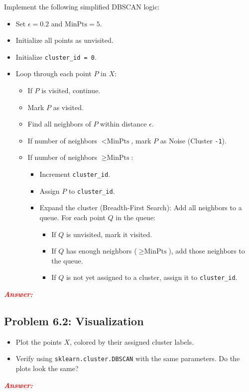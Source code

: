 \documentclass[11pt, letterpaper]{article}
\newcommand{\subproblem}[1]{\subsection*{Problem #1}}
\newcommand{\answer}{\textbf{\textit{\textcolor{red}{Answer:}}}}
\begin{document}
Implement the following simplified DBSCAN logic:
\begin{itemize}
    \item Set $\epsilon = 0.2$ and $\text{MinPts} = 5$.
    \item Initialize all points as unvisited.
    \item Initialize \texttt{cluster\_id = 0}.
    \item Loop through each point $P$ in $X$:
    \begin{itemize}
        \item If $P$ is visited, continue.
        \item Mark $P$ as visited.
        \item Find all neighbors of $P$ within distance $\epsilon$.
        \item If number of neighbors $< \text{MinPts}$, mark $P$ as Noise (Cluster \texttt{-1}).
        \item If number of neighbors $\ge \text{MinPts}$:
        \begin{itemize}
            \item Increment \texttt{cluster\_id}.
            \item Assign $P$ to \texttt{cluster\_id}.
            \item Expand the cluster (Breadth-First Search): Add all neighbors to a queue. For each point $Q$ in the queue:
            \begin{itemize}
                \item If $Q$ is unvisited, mark it visited.
                \item If $Q$ has enough neighbors ($\ge \text{MinPts}$), add those neighbors to the queue.
                \item If $Q$ is not yet assigned to a cluster, assign it to \texttt{cluster\_id}.
            \end{itemize}
        \end{itemize}
    \end{itemize}
\end{itemize}

\answer

\subproblem{6.2: Visualization}
\begin{itemize}
    \item Plot the points $X$, colored by their assigned cluster labels.
    \item Verify using \texttt{sklearn.cluster.DBSCAN} with the same parameters. Do the plots look the same?
\end{itemize}

\answer
\end{document}
